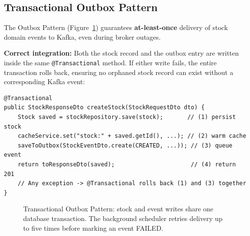\documentclass[12pt,a4paper,twoside]{article}
\begin{document}
\subsection{Transactional Outbox Pattern}
\label{sec:outbox}

The Outbox Pattern (Figure~\ref{fig:outbox}) guarantees \textbf{at-least-once}
delivery of stock domain events to Kafka, even during broker outages.

\textbf{Correct integration:} Both the stock record and the outbox entry are
written inside the same \texttt{@Transactional} method. If either write fails,
the entire transaction rolls back, ensuring no orphaned stock record can exist
without a corresponding Kafka event:

\begin{lstlisting}[style=javaStyle,
  caption={Atomic stock + outbox write in StockService}]
@Transactional
public StockResponseDto createStock(StockRequestDto dto) {
    Stock saved = stockRepository.save(stock);       // (1) persist stock
    cacheService.set("stock:" + saved.getId(), ...); // (2) warm cache
    saveToOutbox(StockEventDto.create(CREATED, ...)); // (3) queue event
    return toResponseDto(saved);                      // (4) return 201
    // Any exception -> @Transactional rolls back (1) and (3) together
}
\end{lstlisting}

\begin{figure}[H]
\centering
{}
\caption{Transactional Outbox Pattern: stock and event writes share one
  database transaction. The background scheduler retries delivery up to
  five times before marking an event FAILED.}
\label{fig:outbox}
\end{figure}
\end{document}
